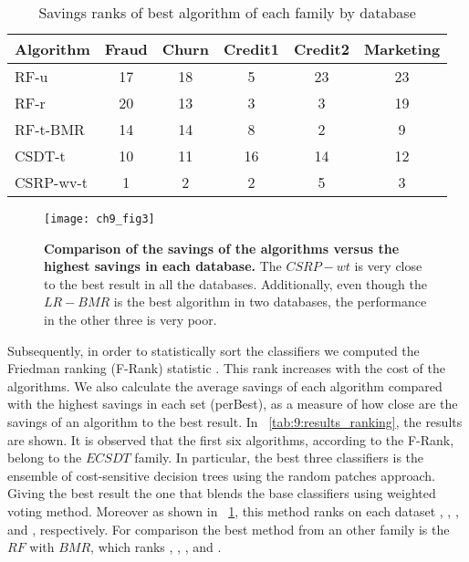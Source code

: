 {\begin{table}[!t]
  \end{table}
  \begin{table}[t]
    \centering
    \footnotesize
    \begin{tabular}{l c c c c c  } %
      \hline
      \bf{Algorithm} & \bf{Fraud} & \bf{Churn} &\bf{Credit1} & \bf{Credit2} & \bf{Marketing} \\
      \hline
      RF-u&17&18&5&23&23\\ 
      RF-r&20&13&3&3&19\\ 
      RF-t-BMR&14&14&8&2&9\\ 
      CSDT-t&10&11&16&14&12\\ 
      CSRP-wv-t&1&2&2&5&3\\ 
      \hline
    \end{tabular}
    \caption{Savings ranks of best algorithm of each family by database}
    \label{tab:9:results_best}
  \end{table}

  \begin{figure}[t]
    \centering
    \texttt{[image: ch9\_fig3]}
    \caption{\textbf{Comparison of the savings of the algorithms versus the highest savings in 
    each database.} The $CSRP-wt$ is very close to the best result in all the databases. 
    Additionally, even though the $LR-BMR$ is the best algorithm in two databases, the performance 
    in the other three is very poor.}
    \label{fig:9:comparison_best}
  \end{figure} 
  
  Subsequently, in order to statistically sort the classifiers we computed the Friedman ranking 
  (F-Rank)  statistic \citep{Demsar2006}. This rank increases with the cost of the algorithms. 
  We also calculate the average savings of each algorithm compared with the highest savings in 
each set (perBest), as a  measure of how close are the savings of an algorithm to the best result. 
  In \tablename{~\ref{tab:9:results_ranking}}, the results are shown. It is observed that  the 
  first six algorithms, according to the F-Rank, belong to the $ECSDT$ family. In particular, the 
  best three classifiers is the ensemble of cost-sensitive decision trees using the random patches 
  approach. Giving the best result the one that blends the base classifiers using weighted voting 
  method. Moreover as shown in  \tablename{~\ref{tab:9:results_best}}, this method ranks on each 
  dataset , , ,  and , respectively. For comparison the best 
  method from an other family is the $RF$ with $BMR$, which ranks , , , 
   and .
   
}
